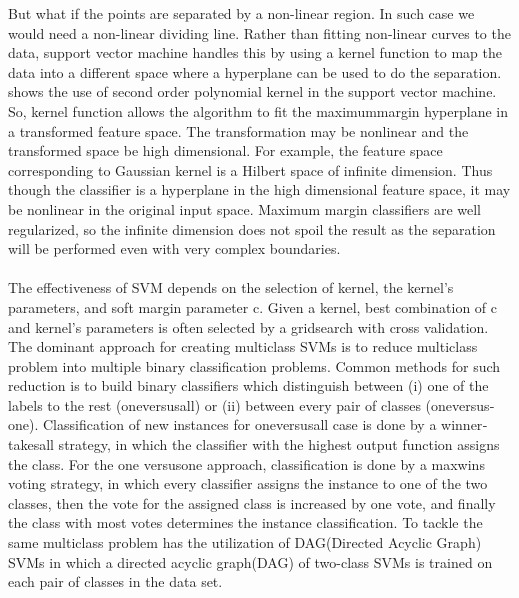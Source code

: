 {But what if the points are separated by a non-linear region. In such case we would need a non-linear dividing line. Rather than fitting
non-linear curves to the data, support vector machine handles this by using a kernel function to map the data into a different space where
a hyperplane can be used to do the separation. \cite{Anglade2010} shows the use of second order polynomial kernel in the support vector machine.
So, kernel function allows the algorithm to fit the maximum­margin hyperplane in a transformed
feature space. The transformation may be nonlinear and the transformed space be high dimensional. For example, the 
feature space corresponding to Gaussian kernel is a Hilbert space of infinite dimension. Thus though the 
classifier is a hyperplane in the high dimensional feature space, it may be nonlinear in the original input 
space. Maximum margin classifiers are well regularized, so the infinite dimension does not spoil the 
result as the separation will be performed even with very complex boundaries.\\
\\
The effectiveness of SVM depends on the selection of kernel, the kernel’s parameters, and soft 
margin parameter c. Given a kernel, best combination of c and kernel’s parameters is often selected by a 
grid­search with cross validation. 
The dominant approach for creating multiclass SVMs is to reduce multi­class problem into 
multiple binary classification problems. Common methods for such reduction is to build binary classifiers 
which distinguish between (i) one of the labels to the rest (one­versus­all) or (ii) between every pair of 
classes (one­versus­one). Classification of new instances for one­versus­all case is done by a 
winner­takes­all strategy, in which the classifier with the highest output function assigns the class. For the 
one ­versus­one approach, classification is done by a max­wins voting strategy, in which every classifier 
assigns the instance to one of the two classes, then the vote for the assigned class is increased by one vote, 
and finally the class with most votes determines the instance classification. To tackle the same multiclass problem \cite{Haggblade2011} has the  
utilization of DAG(Directed Acyclic Graph) SVMs in which a directed acyclic graph(DAG) of two-class SVMs is trained on each pair of classes in the data set.

}
